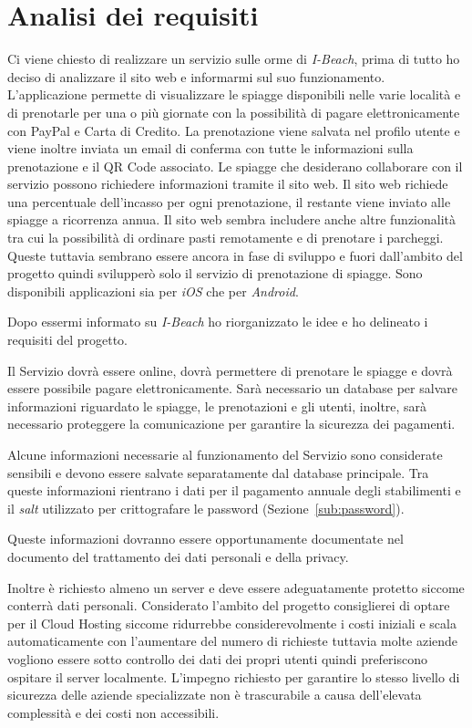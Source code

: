 \section{Analisi dei requisiti}
Ci viene chiesto di realizzare un servizio sulle orme di \emph{I-Beach}, prima di tutto ho deciso di analizzare il sito web e informarmi sul suo funzionamento. L'applicazione permette di visualizzare le spiagge disponibili nelle varie localit\`a e di prenotarle per una o pi\`u giornate con la possibilit\`a di pagare elettronicamente con PayPal e Carta di Credito. La prenotazione viene salvata nel profilo utente e viene inoltre inviata un email di conferma con tutte le informazioni sulla prenotazione e il QR Code associato. Le spiagge che desiderano collaborare con il servizio possono richiedere informazioni tramite il sito web. Il sito web richiede una percentuale dell'incasso per ogni prenotazione, il restante viene inviato alle spiagge a ricorrenza annua. Il sito web sembra includere anche altre funzionalit\`a tra cui la possibilit\`a di ordinare pasti remotamente e di prenotare i parcheggi. Queste tuttavia sembrano essere ancora in fase di sviluppo e fuori dall'ambito del progetto quindi svilupper\`o solo il servizio di prenotazione di spiagge. Sono disponibili applicazioni sia per \emph{iOS} che per \emph{Android}. 

Dopo essermi informato su \emph{I-Beach} ho riorganizzato le idee e ho delineato i requisiti del progetto.

Il Servizio dovr\`a essere online, dovr\`a permettere di prenotare le spiagge e dovr\`a essere possibile pagare elettronicamente. Sar\`a necessario un database per salvare informazioni riguardato le spiagge, le prenotazioni e gli utenti, inoltre, sar\`a necessario proteggere la comunicazione per garantire la sicurezza dei pagamenti.

Alcune informazioni necessarie al funzionamento del Servizio sono considerate sensibili e devono essere salvate separatamente dal database principale. Tra queste informazioni rientrano i dati per il pagamento annuale degli stabilimenti e il \emph{salt} utilizzato per crittografare le password (Sezione~\ref{sub:password}).

Queste informazioni dovranno essere opportunamente documentate nel documento del trattamento dei dati personali e della privacy. 

Inoltre \`e richiesto almeno un server e deve essere adeguatamente protetto siccome conterr\`a dati personali. Considerato l'ambito del progetto consiglierei di optare per il Cloud Hosting siccome ridurrebbe considerevolmente i costi iniziali e scala automaticamente con l'aumentare del numero di richieste tuttavia molte aziende vogliono essere sotto controllo dei dati dei propri utenti quindi preferiscono ospitare il server localmente. L'impegno richiesto per garantire lo stesso livello di sicurezza delle aziende specializzate non \`e trascurabile a causa dell'elevata complessit\`a e dei costi non accessibili.
